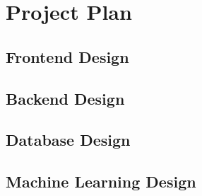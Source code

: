 \documentclass[12pt,two side]{report}
\begin{document}
\chapter{Project Plan}
\section{Frontend Design}
\section{Backend Design}
\section{Database Design}
\section{Machine Learning Design}


\end{document}
